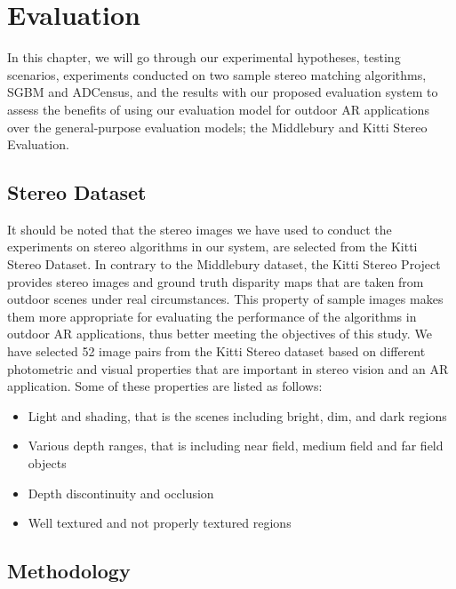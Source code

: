 \chapter{Evaluation}
\label{chap:Evaluation}
\renewcommand{\arraystretch}{0.5}

In this chapter, we will go through our experimental hypotheses, testing scenarios, experiments conducted on two sample 
stereo matching algorithms, SGBM and ADCensus, and the results with our
proposed evaluation system to assess the benefits of using our evaluation model for outdoor AR applications over the general-purpose evaluation models; 
the Middlebury and Kitti Stereo Evaluation.

\section{Stereo Dataset}
It should be noted that the stereo images we have used to conduct the experiments on stereo algorithms in our system,
are selected from the Kitti Stereo Dataset.
In contrary to the Middlebury dataset, the Kitti Stereo Project provides stereo images and ground truth disparity maps
that are taken from outdoor scenes under real circumstances. This property of sample images makes them more appropriate 
for evaluating the performance of the algorithms in outdoor AR applications, thus better meeting the objectives of this study.
We have selected 52 image pairs from the Kitti Stereo dataset based on different photometric and visual properties that are important
in stereo vision and an AR application. Some 
of these properties are listed as follows:
\begin{itemize}
\item Light and shading, that is the scenes including bright, dim, and dark regions
\item Various depth ranges, that is including near field, medium field and far field objects  
\item Depth discontinuity and occlusion
\item Well textured and not properly textured regions
\end{itemize}

\section{Methodology}

